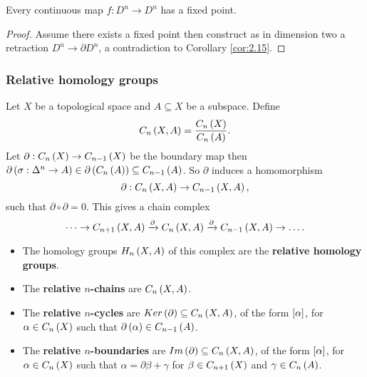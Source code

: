 \begin{theorem}
Every continuous map $ f : D^n \to D^n $ has a fixed point.
\end{theorem}

\begin{proof}
Assume there exists a fixed point then construct as in dimension two a retraction $ D^n \to \partial D^n $, a contradiction to Corollary \ref{cor:2.15}.
\end{proof}

\subsubsection{Relative homology groups}

Let $ X $ be a topological space and $ A \subseteq X $ be a subspace. Define
$$ C_n\rb{X, A} = \dfrac{C_n\rb{X}}{C_n\rb{A}}. $$
Let $ \partial : C_n\rb{X} \to C_{n - 1}\rb{X} $ be the boundary map then $ \partial\rb{\sigma : \Delta^n \to A} \in \partial\rb{C_n\rb{A}} \subseteq C_{n - 1}\rb{A} $. So $ \partial $ induces a homomorphism
$$ \partial : C_n\rb{X, A} \to C_{n - 1}\rb{X, A}, $$
such that $ \partial \circ \partial = 0 $. This gives a chain complex
$$ \dots \to C_{n + 1}\rb{X, A} \xrightarrow{\partial} C_n\rb{X, A} \xrightarrow{\partial} C_{n - 1}\rb{X, A} \to \dots. $$
\begin{itemize}
\item The homology groups $ H_n\rb{X, A} $ of this complex are the \textbf{relative homology groups}.
\item The \textbf{relative $ n $-chains} are $ C_n\rb{X, A} $.
\item The \textbf{relative $ n $-cycles} are $ Ker\rb{\partial} \subseteq C_n\rb{X, A} $, of the form $ \sb{\alpha} $, for $ \alpha \in C_n\rb{X} $ such that $ \partial\rb{\alpha} \in C_{n - 1}\rb{A} $.
\item The \textbf{relative $ n $-boundaries} are $ Im\rb{\partial} \subseteq C_n\rb{X, A} $, of the form $ \sb{\alpha} $, for $ \alpha \in C_n\rb{X} $ such that $ \alpha = \partial\beta + \gamma $ for $ \beta \in C_{n + 1}\rb{X} $ and $ \gamma \in C_n\rb{A} $.
\end{itemize}

\pagebreak


